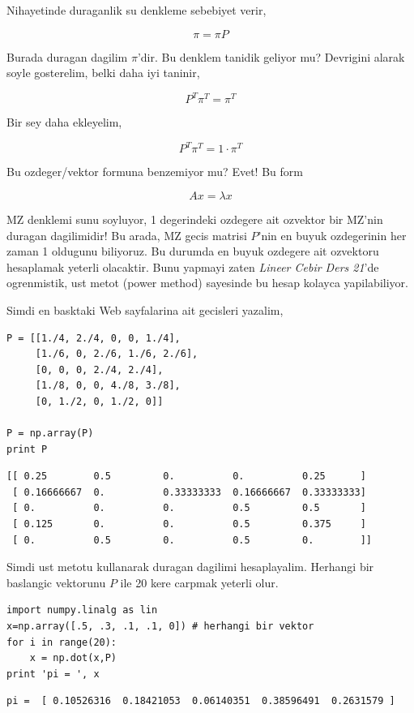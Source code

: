 \documentclass[12pt,fleqn]{article}\usepackage{../common}
\begin{document}
Nihayetinde duraganlik su denkleme sebebiyet verir, 

$$ \pi = \pi P $$

Burada duragan dagilim $\pi$'dir. Bu denklem tanidik geliyor mu?  Devrigini
alarak soyle gosterelim, belki daha iyi taninir, 

$$ P^T\pi^T = \pi^T $$

Bir sey daha ekleyelim, 

$$ P^T\pi^T = 1 \cdot \pi^T $$

Bu ozdeger/vektor formuna benzemiyor mu? Evet! Bu form 

$$ Ax = \lambda x $$

MZ denklemi sunu soyluyor, 1 degerindeki ozdegere ait ozvektor bir MZ'nin
duragan dagilimidir! Bu arada, MZ gecis matrisi $P$'nin en buyuk
ozdegerinin her zaman 1 oldugunu biliyoruz. Bu durumda en buyuk ozdegere
ait ozvektoru hesaplamak yeterli olacaktir. Bunu yapmayi zaten {\em Lineer
  Cebir Ders 21}'de ogrenmistik, ust metot (power method) sayesinde bu
hesap kolayca yapilabiliyor.

Simdi en basktaki Web sayfalarina ait gecisleri yazalim,

\begin{verbatim}
P = [[1./4, 2./4, 0, 0, 1./4],
     [1./6, 0, 2./6, 1./6, 2./6],
     [0, 0, 0, 2./4, 2./4],
     [1./8, 0, 0, 4./8, 3./8],
     [0, 1./2, 0, 1./2, 0]]

P = np.array(P)
print P
\end{verbatim}

\begin{verbatim}
[[ 0.25        0.5         0.          0.          0.25      ]
 [ 0.16666667  0.          0.33333333  0.16666667  0.33333333]
 [ 0.          0.          0.          0.5         0.5       ]
 [ 0.125       0.          0.          0.5         0.375     ]
 [ 0.          0.5         0.          0.5         0.        ]]
\end{verbatim}

Simdi ust metotu kullanarak duragan dagilimi hesaplayalim. Herhangi bir
baslangic vektorunu $P$ ile 20 kere  carpmak yeterli olur.

\begin{verbatim}
import numpy.linalg as lin
x=np.array([.5, .3, .1, .1, 0]) # herhangi bir vektor
for i in range(20): 
    x = np.dot(x,P)
print 'pi = ', x
\end{verbatim}

\begin{verbatim}
pi =  [ 0.10526316  0.18421053  0.06140351  0.38596491  0.2631579 ]
\end{verbatim}
\end{document}
